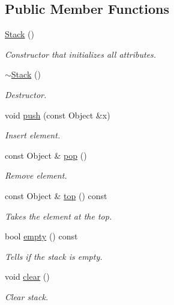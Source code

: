 \subsection*{Public Member Functions}
\begin{DoxyCompactItemize}
\item 
\hyperlink{classStack_a78a698445d1ac0e1bb2d2678c3e6b4df}{Stack} ()\hypertarget{classStack_a78a698445d1ac0e1bb2d2678c3e6b4df}{}\label{classStack_a78a698445d1ac0e1bb2d2678c3e6b4df}

\begin{DoxyCompactList}\small\item\em Constructor that initializes all attributes. \end{DoxyCompactList}\item 
\hyperlink{classStack_a853c2cc752287e206ea4d759f7baa211}{$\sim$\+Stack} ()\hypertarget{classStack_a853c2cc752287e206ea4d759f7baa211}{}\label{classStack_a853c2cc752287e206ea4d759f7baa211}

\begin{DoxyCompactList}\small\item\em Destructor. \end{DoxyCompactList}\item 
void \hyperlink{classStack_a7a7712fc7e216d9a5ebdff5e2eb82e64}{push} (const Object \&x)\hypertarget{classStack_a7a7712fc7e216d9a5ebdff5e2eb82e64}{}\label{classStack_a7a7712fc7e216d9a5ebdff5e2eb82e64}

\begin{DoxyCompactList}\small\item\em Insert element. \end{DoxyCompactList}\item 
const Object \& \hyperlink{classStack_a3057daa6cff18f7335afe5a1e3f3fd04}{pop} ()
\begin{DoxyCompactList}\small\item\em Remove element. \end{DoxyCompactList}\item 
const Object \& \hyperlink{classStack_a22b3d15b5604db3175589ade35f9a9c9}{top} () const 
\begin{DoxyCompactList}\small\item\em Takes the element at the top. \end{DoxyCompactList}\item 
bool \hyperlink{classStack_ae11870056b681ec3362faca36d6910ec}{empty} () const 
\begin{DoxyCompactList}\small\item\em Tells if the stack is empty. \end{DoxyCompactList}\item 
void \hyperlink{classStack_ac209ae083b7050deb2139f412f9b3861}{clear} ()\hypertarget{classStack_ac209ae083b7050deb2139f412f9b3861}{}\label{classStack_ac209ae083b7050deb2139f412f9b3861}

\begin{DoxyCompactList}\small\item\em Clear stack. \end{DoxyCompactList}\end{DoxyCompactItemize}
